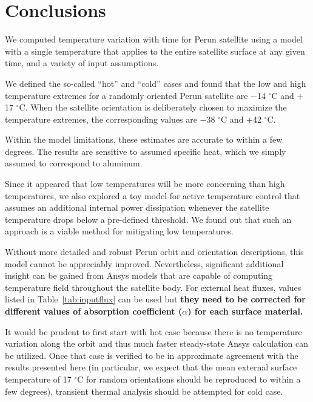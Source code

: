 \documentclass[]{aastex62}
\begin{document}
\section{Conclusions \label{sec:conclusions}} 

We computed temperature variation with time for Perun satellite using a model with a single 
temperature that applies to the entire satellite surface at any given time, and a variety of input 
assumptions. 
 
We defined the so-called ``hot'' and ``cold'' cases and found that the low and high temperature 
extremes for a randomly oriented Perun satellite are $-$14 $^\circ$C and $+$17 $^\circ$C. When the 
satellite orientation is deliberately chosen to maximize the temperature extremes, the corresponding 
values are $-$38 $^\circ$C and $+$42 $^\circ$C. 

Within the model limitations, these estimates are accurate to within a few degrees. The results are 
sensitive to assumed specific heat, which we simply assumed to correspond to aluminum. 

Since it appeared that low temperatures will be more concerning than high temperatures,
we also explored a toy model for active temperature control that assumes an additional internal 
power dissipation whenever the satellite temperature drops below a pre-defined threshold. 
We found out that such an approach is a viable method for mitigating low temperatures.

Without more detailed and robust Perun orbit and orientation descriptions, this model cannot
be appreciably improved. Nevertheless, significant additional insight can be gained from Ansys
models that are capable of computing temperature field throughout the satellite body. For
external heat fluxes, values listed in Table~\ref{tab:inputflux} can be used but {\bf they need
to be corrected for different values of absorption coefficient ($\alpha$) for each surface 
material.} 

It would be prudent to first start with hot case because there is no temperature variation along
the orbit and thus much faster steady-state Ansys calculation can be utilized. Once that case is verified
to be in approximate agreement with the results presented here (in particular, we expect that
the mean external surface temperature of 17 $^\circ$C for random orientations should be reproduced
to within a few degrees), transient thermal analysis should be attempted for cold case. 
\end{document}
